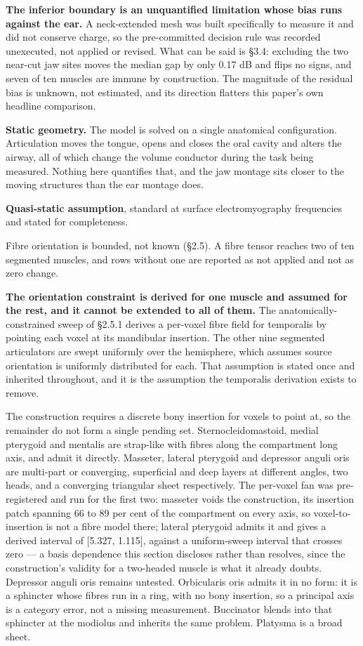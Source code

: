 \documentclass[
  11pt,
  a4paper,
]{article}
\begin{document}
\textbf{The inferior boundary is an unquantified limitation whose bias runs against
the ear.} A neck-extended mesh was built specifically to measure it and did not
conserve charge, so the pre-committed decision rule was recorded unexecuted, not
applied or revised. What can be said is \S{}3.4: excluding the two near-cut jaw
sites moves the median gap by only \textminus{}0.17 dB and flips no signs, and seven of ten
muscles are immune by construction. The magnitude of the residual bias is
unknown, not estimated, and its direction flatters this paper's own headline
comparison.

\textbf{Static geometry.} The model is solved on a single anatomical configuration.
Articulation moves the tongue, opens and closes the oral cavity and alters the
airway, all of which change the volume conductor during the task being measured.
Nothing here quantifies that, and the jaw montage sits closer to the moving
structures than the ear montage does.

\textbf{Quasi-static assumption}, standard at surface electromyography frequencies
and stated for completeness.

Fibre orientation is bounded, not known (\S{}2.5). A fibre tensor reaches two of
ten segmented muscles, and rows without one are reported as not applied and not
as zero change.

\textbf{The orientation constraint is derived for one muscle and assumed for the rest,
and it cannot be extended to all of them.} The anatomically-constrained sweep of
\S{}2.5.1 derives a per-voxel fibre field for temporalis by pointing each voxel at
its mandibular insertion. The other nine segmented articulators are swept
uniformly over the hemisphere, which assumes source orientation is uniformly
distributed for each. That assumption is stated once and inherited throughout,
and it is the assumption the temporalis derivation exists to remove.

The construction requires a discrete bony insertion for voxels to point at, so
the remainder do not form a single pending set. Sternocleidomastoid, medial
pterygoid and mentalis are strap-like with fibres along the compartment long
axis, and admit it directly. Masseter, lateral pterygoid and depressor anguli
oris are multi-part or converging, superficial and deep layers at different
angles, two heads, and a converging triangular sheet respectively. The
per-voxel fan was pre-registered and run for the first two: masseter voids the
construction, its insertion patch spanning 66 to 89 per cent of the
compartment on every axis, so voxel-to-insertion is not a fibre model there;
lateral pterygoid admits it and gives a derived interval of {[}\textminus{}5.327, \textminus{}1.115{]},
against a uniform-sweep interval that crosses zero --- a basis dependence this
section discloses rather than resolves, since the construction's validity for
a two-headed muscle is what it already doubts. Depressor anguli oris remains
untested. Orbicularis oris admits it in no form: it is a sphincter whose
fibres run in a ring, with no bony insertion, so a principal axis is a category
error, not a missing measurement. Buccinator blends into that sphincter at the
modiolus and inherits the same problem. Platysma is a broad sheet.
\end{document}
